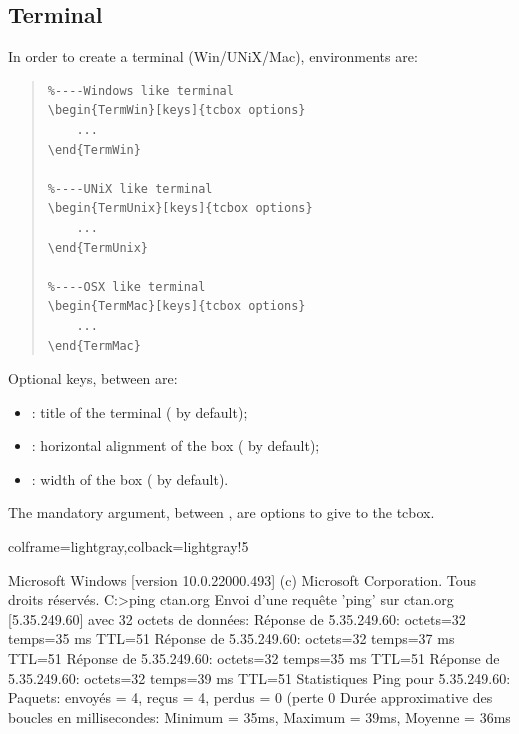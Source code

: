 \documentclass[11pt,a4paper]{ltxdoc}
\begin{document}
\pagebreak

\subsection{Terminal}

In order to create a terminal (Win/UNiX/Mac), environments are:

\begin{quote}
\begin{verbatim}
%----Windows like terminal
\begin{TermWin}[keys]{tcbox options}
    ...
\end{TermWin}

%----UNiX like terminal
\begin{TermUnix}[keys]{tcbox options}
    ...
\end{TermUnix}

%----OSX like terminal
\begin{TermMac}[keys]{tcbox options}
    ...
\end{TermMac}
\end{verbatim}
\end{quote}

Optional keys, between \MontreCode{[...]} are:

\begin{itemize}
	\item {}: title of the terminal ( by default);
	\item {}: horizontal alignment of the box ( by default);
	\item {}: width of the box ( by default).
\end{itemize}

\medskip

The mandatory argument, between , are options to give to the tcbox.

\begin{tcblisting}{colframe=lightgray,colback=lightgray!5}
\begin{TermWin}{}
Microsoft Windows [version 10.0.22000.493]
(c) Microsoft Corporation. Tous droits réservés.
C:\Users\test>ping ctan.org
Envoi d'une requête 'ping' sur ctan.org [5.35.249.60] avec 32 octets de données:
Réponse de 5.35.249.60: octets=32 temps=35 ms TTL=51
Réponse de 5.35.249.60: octets=32 temps=37 ms TTL=51
Réponse de 5.35.249.60: octets=32 temps=35 ms TTL=51
Réponse de 5.35.249.60: octets=32 temps=39 ms TTL=51
Statistiques Ping pour 5.35.249.60:
Paquets: envoyés = 4, reçus = 4, perdus = 0 (perte 0%
Durée approximative des boucles en millisecondes:
Minimum = 35ms, Maximum = 39ms, Moyenne = 36ms
\end{TermWin}
\end{tcblisting}
\end{document}
